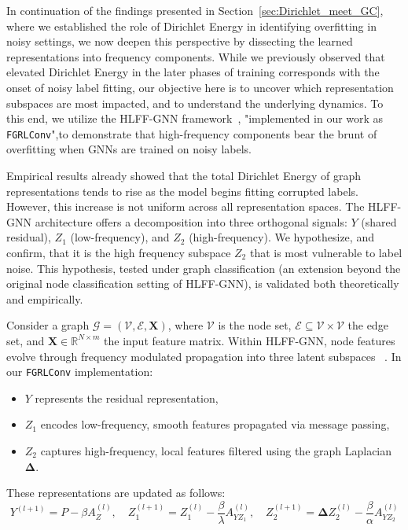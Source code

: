 In continuation of the findings presented in Section~\ref{sec:Dirichlet_meet_GC}, where we established the role of Dirichlet Energy in identifying overfitting in noisy settings, we now deepen this perspective by dissecting the learned representations into frequency components. While we previously observed that elevated Dirichlet Energy in the later phases of training corresponds with the onset of noisy label fitting, our objective here is to uncover which representation subspaces are most impacted, and to understand the underlying dynamics. To this end, we utilize the HLFF-GNN framework~\cite{hlffgnn}, "implemented in our work as \texttt{FGRLConv}",to demonstrate that high-frequency components bear the brunt of overfitting when GNNs are trained on noisy labels.

Empirical results already showed that the total Dirichlet Energy of graph representations tends to rise as the model begins fitting corrupted labels. However, this increase is not uniform across all representation spaces. The HLFF-GNN architecture offers a decomposition into three orthogonal signals: \( Y \) (shared residual), \( Z_1 \) (low-frequency), and \( Z_2 \) (high-frequency). We hypothesize, and confirm, that it is the high frequency subspace \( Z_2 \) that is most vulnerable to label noise. This hypothesis, tested under graph classification (an extension beyond the original node classification setting of HLFF-GNN), is validated both theoretically and empirically.

Consider a graph \( \mathcal{G} = (\mathcal{V}, \mathcal{E}, \mathbf{X}) \), where \( \mathcal{V} \) is the node set, \( \mathcal{E} \subseteq \mathcal{V} \times \mathcal{V} \) the edge set, and \( \mathbf{X} \in \mathbb{R}^{N \times m} \) the input feature matrix. Within HLFF-GNN, node features evolve through frequency modulated propagation into three latent subspaces ~\cite{hlffgnn}. In our \texttt{FGRLConv} implementation:

\begin{itemize}
    \item \( Y \) represents the residual representation,
    \item \( Z_1 \) encodes low-frequency, smooth features propagated via message passing,
    \item \( Z_2 \) captures high-frequency, local features filtered using the graph Laplacian \( \mathbf{\Delta} \).
\end{itemize}

These representations are updated as follows:
\[
Y^{(l+1)} = P - \beta A_Z^{(l)}, \quad
Z_1^{(l+1)} = Z_1^{(l)} - \frac{\beta}{\lambda} A_{YZ_1}^{(l)}, \quad
Z_2^{(l+1)} = \mathbf{\Delta} Z_2^{(l)} - \frac{\beta}{\alpha} A_{YZ_2}^{(l)}
\]

